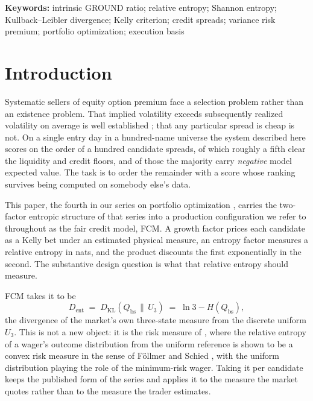 \documentclass[11pt]{article}
\newcommand{\dkl}{D_{\mathrm{KL}}}
\newcommand{\dent}{D_{\mathrm{ent}}}
\newcommand{\Qbs}{Q_{\mathrm{bs}}}
\begin{document}
\noindent\textbf{Keywords:} intrinsic GROUND ratio; relative entropy; Shannon
entropy; Kullback--Leibler divergence; Kelly criterion; credit spreads;
variance risk premium; portfolio optimization; execution basis

\section{Introduction}
\label{sec:intro}

Systematic sellers of equity option premium face a selection problem rather
than an existence problem. That implied volatility exceeds subsequently
realized volatility on average is well established
\cite{carrwu2009, bollerslev2009, bakshikapadia2003}; that any particular
spread is cheap is not. On a single entry day in a hundred-name universe the
system described here scores on the order of a hundred candidate spreads, of
which roughly a fifth clear the liquidity and credit floors, and of those the
majority carry \emph{negative} model expected value. The task is to order the
remainder with a score whose ranking survives being computed on somebody
else's data.

This paper, the fourth in our series on portfolio optimization
\cite{mercurio2020repo, mercurio2020binary, mercurio2020gepo}, carries the
two-factor entropic structure of that series into a production configuration we
refer to throughout as the fair credit model, FCM. A growth factor prices each
candidate as a Kelly bet \cite{kelly1956} under an estimated physical measure,
an entropy factor measures a relative entropy in nats, and the product
discounts the first exponentially in the second. The substantive design question
is what that relative entropy should measure.

FCM takes it to be
\begin{equation}
\dent \;=\; \dkl(\Qbs \,\|\, U_3) \;=\; \ln 3 - H(\Qbs),
\label{eq:dent-intro}
\end{equation}
the divergence of the market's own three-state measure from the discrete
uniform $U_3$. This is not a new object: it is the risk measure of
\cite{mercurio2020binary}, where the relative entropy of a wager's outcome
distribution from the uniform reference is shown to be a convex risk measure
in the sense of F\"ollmer and Schied \cite{follmer2002}, with the uniform
distribution playing the role of the minimum-risk wager. Taking it per
candidate keeps the published form of the series and applies it to the measure
the market quotes rather than to the measure the trader estimates.
\end{document}
